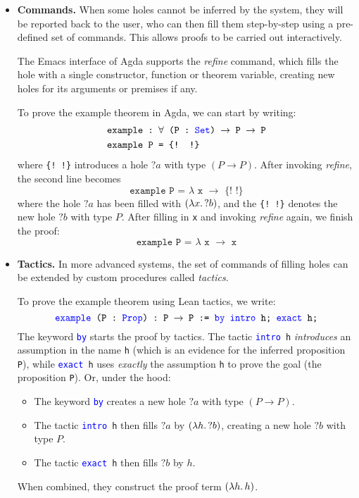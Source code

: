 \documentclass[twoside]{report}
\begin{document}
\begin{itemize}
    \item \textbf{Commands.} When some holes cannot be inferred by the system, they will be reported back to the user, who can then fill them step-by-step using a pre-defined set of commands. This allows proofs to be carried out interactively.

    \begin{example}
    The Emacs interface of Agda \cite{coquand2006emacs} supports the \emph{refine} command, which fills the hole with a single constructor, function or theorem variable, creating new holes for its arguments or premises if any.

    To prove the example theorem in Agda, we can start by writing:
    $$
    \begin{aligned}
    &\texttt{example :\ $\forall$ (P :\ \textcolor{blue}{Set}) $\rightarrow$ P $\rightarrow$ P} \\
    &\texttt{example P = \{! !\}}        
    \end{aligned}
    $$
    where \texttt{\{! !\}} introduces a hole ${?a}$ with type $(P \rightarrow P)$. After invoking \emph{refine}, the second line becomes
    $$\texttt{example P = $\lambda$ x $\rightarrow$ \{! !\}}$$
    where the hole ${?a}$ has been filled with $(\lambda{x}.\,{?b})$, and the \texttt{\{! !\}} denotes the new hole ${?b}$ with type $P$. After filling in \texttt{x} and invoking \emph{refine} again, we finish the proof:
    $$\texttt{example P = $\lambda$ x $\rightarrow$ x}$$
    \end{example}
    
    \item \textbf{Tactics.} In more advanced systems, the set of commands of filling holes can be extended by custom procedures called \emph{tactics}.

    \begin{example}
    To prove the example theorem using Lean tactics, we write:
    $$\texttt{\textcolor{blue}{example} (P : \textcolor{blue}{Prop}) :\ P $\rightarrow$ P := \textcolor{blue}{by} \textcolor{blue}{intro} h; \textcolor{blue}{exact} h;}$$
    The keyword \texttt{\textcolor{blue}{by}} starts the proof by tactics. The tactic \texttt{\textcolor{blue}{intro} h} \emph{introduces} an assumption in the name \texttt{h} (which is an evidence for the inferred proposition \texttt{P}), while \texttt{\textcolor{blue}{exact} h} uses \emph{exactly} the assumption \texttt{h} to prove the goal (the proposition \texttt{P}). Or, under the hood:
    \begin{itemize}
        \item The keyword \texttt{\textcolor{blue}{by}} creates a new hole ${?a}$ with type $(P \rightarrow P)$.
        \item The tactic \texttt{\textcolor{blue}{intro} h} then fills ${?a}$ by $(\lambda{h}.\,{?b})$, creating a new hole ${?b}$ with type $P$.
        \item The tactic \texttt{\textcolor{blue}{exact} h} then fills ${?b}$ by $h$.
    \end{itemize}
    When combined, they construct the proof term $(\lambda{h}.\,{h})$.


\end{example}
\end{itemize}
\end{document}
